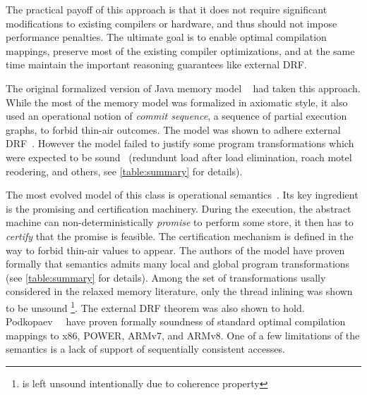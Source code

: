 The practical payoff of this approach is that it 
does not require significant modifications to existing compilers or hardware, 
and thus should not impose performance penalties.  
The ultimate goal is to enable optimal compilation mappings, 
preserve most of the existing compiler optimizations, 
and at the same time maintain the important 
reasoning guarantees like external DRF. 

The original formalized version of Java memory model \JMM~\cite{Manson-al:POPL05}
had taken this approach. While the most of the memory model 
was formalized in axiomatic style, it also used 
an operational notion of \emph{commit sequence}, 
\ie a sequence of partial execution graphs, to forbid thin-air outcomes. 
The model was shown to adhere external DRF~\cite{Huisman-Petri:CONCUR07}.
However the model failed to justify some program transformations 
which were expected to be sound~\cite{Sevcik-Aspinall:ECOOP08} 
(\eg redundunt load after load elimination, roach motel reodering, and others,
see \cref{table:summary} for details). 

The most evolved model of this class is 
\Promising operational semantics~\cite{Kang-al:POPL17, Lee-al:PLDI20}. 
Its key ingredient is the promising and certification machinery.
During the execution, the abstract machine can 
non-deterministically \emph{promise} to perform some store,
it then has to \emph{certify} that the promise is feasible. 
The certification mechanism is defined in the way to forbid thin-air values to appear.
The authors of the model have proven formally 
that \Promising semantics admits many local and global program transformations
(see \cref{table:summary} for details).
Among the set of transformations usally considered 
in the relaxed memory literature, 
only the thread inlining was shown to be unsound%
\footnote{\CSE is left unsound intentionally due to coherence property}. 
The external DRF theorem was also shown to hold. 
Podkopaev~\etal~\cite{Podkopaev-al:ECOOP17, Podkopaev-al:POPL19} have proven formally
soundness of standard optimal compilation mappings to x86, POWER, ARMv7, and ARMv8.
One of a few limitations of the \Promising semantics is a lack 
of support of sequentially consistent accesses. 


